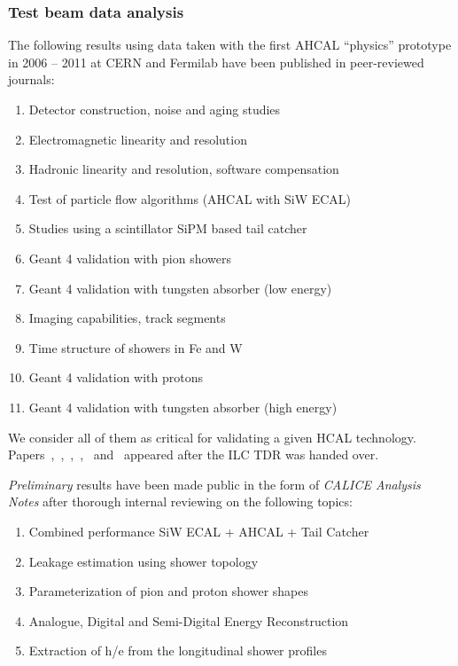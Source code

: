 \subsubsection{Test beam data analysis}
The following results using data taken with the first AHCAL ``physics'' prototype in 2006 -- 2011 at CERN and Fermilab have been published in peer-reviewed journals:
\begin{enumerate}
\item Detector construction, noise and aging studies~\cite{1748-0221-5-05-P05004}
\item Electromagnetic linearity and resolution~\cite{1748-0221-6-04-P04003}
\item Hadronic linearity and resolution, software compensation~\cite{1748-0221-7-09-P09017}
\item Test of particle flow algorithms (AHCAL with SiW ECAL)~\cite{1748-0221-6-07-P07005}
\item Studies using a scintillator SiPM based tail catcher~\cite{1748-0221-7-04-P04015}
\item Geant 4 validation with pion showers~\cite{1748-0221-8-07-P07005}
\item Geant 4 validation with tungsten absorber (low energy)~\cite{1748-0221-9-01-P01004}
\item Imaging capabilities, track segments~\cite{1748-0221-8-09-P09001}
\item Time structure of showers in Fe and W~\cite{1748-0221-9-07-P07022}
\item Geant 4 validation with protons~\cite{1748-0221-10-04-P04014}
\item Geant 4 validation with tungsten absorber (high energy)~\cite{Blaising:2015nla}
\end{enumerate}

We consider all of them as critical for validating a given HCAL technology. Papers~\cite{1748-0221-8-07-P07005},~\cite{1748-0221-9-01-P01004},~\cite{1748-0221-8-09-P09001},~\cite{1748-0221-9-07-P07022},~\cite{1748-0221-10-04-P04014} and~\cite{Blaising:2015nla} appeared after the ILC TDR was handed over.

\emph{Preliminary} results have been made public in the form of \emph{CALICE Analysis Notes} after thorough internal reviewing on the following topics:
\begin{enumerate}
\item Combined performance SiW ECAL + AHCAL + Tail Catcher~\cite{Calice:CAN015}
\item Leakage estimation using shower topology~\cite{Marchesini:CAN029}
\item Parameterization of pion and proton shower shapes~\cite{Calice:CAN048}
\item Analogue, Digital and Semi-Digital Energy Reconstruction~\cite{Calice:CAN049}
\item Extraction of h/e from the longitudinal shower profiles~\cite{Calice:CAN051}
\end{enumerate}


